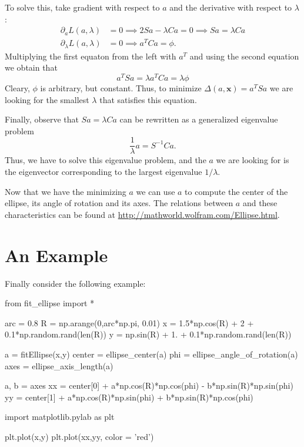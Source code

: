 \documentclass[a4paper,11pt]{article}
\begin{document}
To solve this, take gradient with respect to $a$ and the derivative with respect to $\lambda$:
\begin{align*}
  \partial_a L(a, \lambda) & = 0 \implies 2 S a - \lambda C a  = 0 \implies S a = \lambda C a \\
  \partial_\lambda L(a, \lambda) & = 0 \implies a^T C a = \phi.
\end{align*}
Multiplying the first equaton from the left with $a^T$ and using the second equation we obtain that
\begin{equation*}
a^T S a = \lambda a^T C a = \lambda \phi
\end{equation*}
Cleary, $\phi$ is arbitrary, but constant. Thus, to minimize
$\Delta(a, \mathbf{x})= a^T S a$ we are looking for the smallest
$\lambda$ that satisfies this equation.

Finally, observe that $S a = \lambda C a$ can be rewritten as a generalized eigenvalue problem
%
\begin{equation*}
\frac{1}{\lambda} a = S^{-1} C a.
\end{equation*}
Thus, we have to solve this eigenvalue problem, and the $a$ we are looking for is the eigenvector corresponding to the largest eigenvalue $1/\lambda$.

Now that we have the minimizing $a$ we can use $a$ to compute the center of the ellipse, its angle of rotation and its axes.
The relations between $a$ and these characteristics can be found at \url{http://mathworld.wolfram.com/Ellipse.html}.

\section{An Example}

Finally consider the following example:

\begin{pyblock}
from fit_ellipse import *

arc = 0.8
R = np.arange(0,arc*np.pi, 0.01)
x = 1.5*np.cos(R) + 2 + 0.1*np.random.rand(len(R))
y = np.sin(R) + 1. + 0.1*np.random.rand(len(R))

a = fitEllipse(x,y)
center = ellipse_center(a)
phi = ellipse_angle_of_rotation(a)
axes = ellipse_axis_length(a)

a, b = axes
xx = center[0] + a*np.cos(R)*np.cos(phi) - b*np.sin(R)*np.sin(phi)
yy = center[1] + a*np.cos(R)*np.sin(phi) + b*np.sin(R)*np.cos(phi)

import matplotlib.pylab as plt

plt.plot(x,y)
plt.plot(xx,yy, color = 'red')
\end{pyblock}
\end{document}
